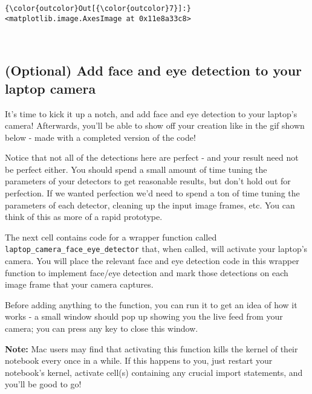 \documentclass[11pt]{article}
\begin{document}
\begin{Verbatim}[commandchars=\\\{\}]
{\color{outcolor}Out[{\color{outcolor}7}]:} <matplotlib.image.AxesImage at 0x11e8a33c8>
\end{Verbatim}
            
    \begin{center}
    \end{center}
    { \hspace*{\fill} \\}
    
    \hypertarget{optional-add-face-and-eye-detection-to-your-laptop-camera}{%
\subsection{(Optional) Add face and eye detection to your laptop
camera}\label{optional-add-face-and-eye-detection-to-your-laptop-camera}}

It's time to kick it up a notch, and add face and eye detection to your
laptop's camera! Afterwards, you'll be able to show off your creation
like in the gif shown below - made with a completed version of the code!

Notice that not all of the detections here are perfect - and your result
need not be perfect either. You should spend a small amount of time
tuning the parameters of your detectors to get reasonable results, but
don't hold out for perfection. If we wanted perfection we'd need to
spend a ton of time tuning the parameters of each detector, cleaning up
the input image frames, etc. You can think of this as more of a rapid
prototype.

The next cell contains code for a wrapper function called
\texttt{laptop\_camera\_face\_eye\_detector} that, when called, will
activate your laptop's camera. You will place the relevant face and eye
detection code in this wrapper function to implement face/eye detection
and mark those detections on each image frame that your camera captures.

Before adding anything to the function, you can run it to get an idea of
how it works - a small window should pop up showing you the live feed
from your camera; you can press any key to close this window.

\textbf{Note:} Mac users may find that activating this function kills
the kernel of their notebook every once in a while. If this happens to
you, just restart your notebook's kernel, activate cell(s) containing
any crucial import statements, and you'll be good to go!
\end{document}
